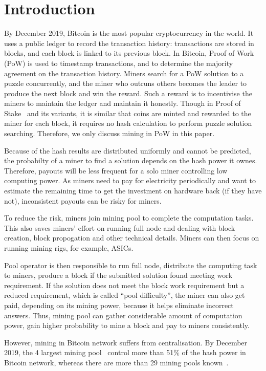 \section{Introduction}

By December 2019, Bitcoin is the most popular cryptocurrency in the world.
It uses a public ledger to record the transaction history: transactions are stored in blocks, and each block is linked to its previous block.
In Bitcoin, Proof of Work (PoW) is used to timestamp transactions, and to determine the majority agreement on the transaction history.
Miners search for a PoW solution to a puzzle concurrently, and the miner who outruns others becomes the leader to produce the next block and win the reward.
Such a reward is to incentivise the miners to maintain the ledger and maintain it honestly.
Though in Proof of Stake~\cite{} and its variants, it is similar that coins are minted and rewarded to the miner for each block, it requires no hash calculation to perform puzzle solution searching.
Therefore, we only discuss mining in PoW in this paper.

Because of the hash results are distributed uniformly and cannot be predicted, the probabilty of a miner to find a solution depends on the hash power it ownes.
Therefore, payouts will be less frequent for a solo miner controlling low computing power.
As miners need to pay for electricity periodically and want to estimate the remaining time to get the investment on hardware back (if they have not), inconsistent payouts can be risky for miners.

To reduce the risk, miners join mining pool to complete the computation tasks.
This also saves miners' effort on running full node and dealing with block creation, block propogation and other technical details.
Miners can then focus on running mining rigs, for example, ASICs.

Pool operator is then responsible to run full node, distribute the computing task to miners, 
produce a block if the submitted solution found meeting work requirement.
If the solution does not meet the block work requirement but a reduced requirement, which is called ``pool difficulty'', the miner can also get paid, depending on its mining power, because it helps eliminate incorrect answers.
Thus, mining pool can gather considerable amount of computation power, gain higher probability to mine a block and pay to miners consistently.

However, mining in Bitcoin network suffers from centralisation.
By December 2019, the 4 largest mining pool~\cite{}  control more than 51\% of the hash power in Bitcoin network, whereas there are more than 29 mining pools known~\cite{}.

